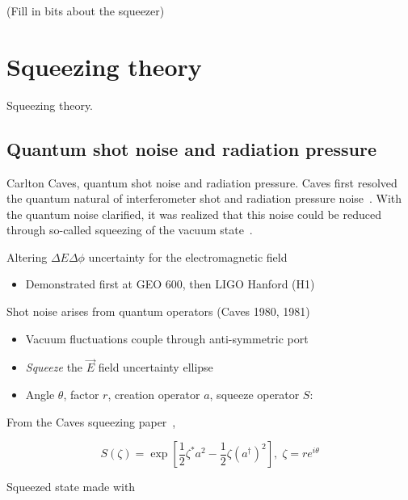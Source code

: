 

    (Fill in bits about the squeezer)

    \section{Squeezing theory}
    \label{squeezing_theory}

        Squeezing theory.

        \subsection{Quantum shot noise and radiation pressure}
        \label{quantum_noise}

            Carlton Caves, quantum shot noise and radiation pressure.
            Caves first resolved the quantum natural of interferometer shot and radiation pressure noise~\cite{Caves1980}.
            With the quantum noise clarified, it was realized that this noise could be reduced through so-called squeezing of the vacuum state~\cite{Caves1981}.


Altering $\Delta E\Delta\phi$ uncertainty for the electromagnetic
field
\begin{itemize}
\item Demonstrated first at GEO 600, then LIGO Hanford (H1)\end{itemize}
\begin{theorem}
Shot noise arises from quantum operators (Caves 1980, 1981)\end{theorem}
\begin{itemize}
\item Vacuum fluctuations couple through anti-symmetric port
\item \emph{Squeeze }the $\overrightarrow{E}$ field uncertainty ellipse
\item Angle $\theta$, factor $r$, creation operator $a$, squeeze operator
$S$:
\end{itemize}

From the Caves squeezing paper~\cite{Caves1981},

\[
S(\zeta)=\exp[\frac{1}{2}\zeta^{*}a^{2}-\frac{1}{2}\zeta(a^{\dagger})^{2}],\;\zeta=re^{i\theta}
\]



Squeezed state made with


